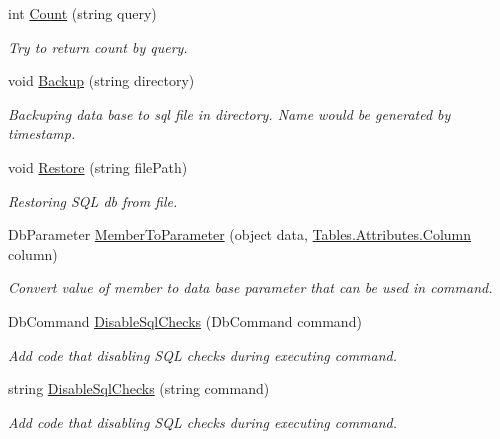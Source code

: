 \begin{DoxyCompactItemize}
int \mbox{\hyperlink{interface_uniform_data_operator_1_1_sql_1_1_i_sql_operator_ad53cec492d507ed154f5535ce1db4e42}{Count}} (string query)
\begin{DoxyCompactList}\small\item\em Try to return count by query. \end{DoxyCompactList}\item 
void \mbox{\hyperlink{interface_uniform_data_operator_1_1_sql_1_1_i_sql_operator_a096be4f746c1fcbb8b2894c2517b937c}{Backup}} (string directory)
\begin{DoxyCompactList}\small\item\em Backuping data base to sql file in directory. Name would be generated by timestamp. \end{DoxyCompactList}\item 
void \mbox{\hyperlink{interface_uniform_data_operator_1_1_sql_1_1_i_sql_operator_acf6fdbfc57a21efc371e0772244defd5}{Restore}} (string file\+Path)
\begin{DoxyCompactList}\small\item\em Restoring S\+QL db from file. \end{DoxyCompactList}\item 
Db\+Parameter \mbox{\hyperlink{interface_uniform_data_operator_1_1_sql_1_1_i_sql_operator_ab43375e7f5d9dcce2adfef2f19a2078f}{Member\+To\+Parameter}} (object data, \mbox{\hyperlink{class_uniform_data_operator_1_1_sql_1_1_tables_1_1_attributes_1_1_column}{Tables.\+Attributes.\+Column}} column)
\begin{DoxyCompactList}\small\item\em Convert value of member to data base parameter that can be used in command. \end{DoxyCompactList}\item 
Db\+Command \mbox{\hyperlink{interface_uniform_data_operator_1_1_sql_1_1_i_sql_operator_a12d464e0532a3e194b1221eee0c32d34}{Disable\+Sql\+Checks}} (Db\+Command command)
\begin{DoxyCompactList}\small\item\em Add code that disabling S\+QL checks during executing command. \end{DoxyCompactList}\item 
string \mbox{\hyperlink{interface_uniform_data_operator_1_1_sql_1_1_i_sql_operator_a0757f304a24ffaa743e23e8bdd210950}{Disable\+Sql\+Checks}} (string command)
\begin{DoxyCompactList}\small\item\em Add code that disabling S\+QL checks during executing command. \end{DoxyCompactList}\item 

\end{DoxyCompactItemize}
